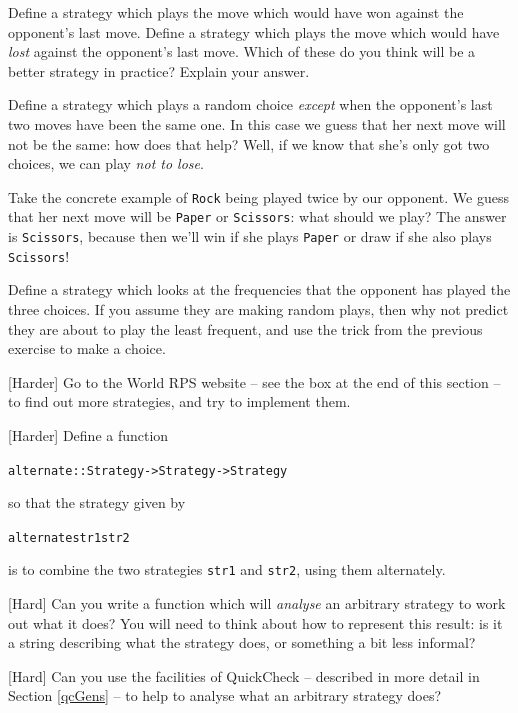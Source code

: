 \begin{exercises}

\item
Define a strategy which plays the move which would have won against the opponent's last move. Define a strategy which plays the move which would have \emph{lost} against the opponent's last move. Which of these do you think will be a better strategy in practice? Explain your answer.

\item
Define a strategy which plays a random choice \emph{except} when the opponent's last two moves have been the same one. In this case we guess that her next move will not be the same: how does that help? Well, if we know that she's only got two choices, we can play \emph{not to lose}. 

Take the concrete example of \texttt{Rock} being played twice by our opponent. We guess that her next move will be \texttt{Paper} or \texttt{Scissors}: what should we play? The answer is \texttt{Scissors}, because then we'll win if she plays \texttt{Paper} or draw if she also plays \texttt{Scissors}!

\item
Define a strategy which looks at the frequencies that the opponent has played the three choices. If you assume they are making random plays, then why not predict they are about to play the least frequent, and use the trick from the previous exercise to make a choice.

\item {[Harder]}
Go to the World RPS website -- see the box at the end of this section -- to find out more strategies, and try to implement them.

\item {[Harder]}
Define a function 
\begin{alltt}
alternate :: Strategy -> Strategy -> Strategy
\end{alltt}
so that the strategy given by
\begin{alltt}
alternate str1 str2
\end{alltt}
is to combine the two strategies \texttt{str1} and \texttt{str2}, using them alternately.

\item {[Hard]}
Can you write a function which will \emph{analyse} an arbitrary strategy to work out what it does? You will need to think about how to represent this result: is it a string describing what the strategy does, or something a bit less informal?

\item {[Hard]}
Can you use the facilities of QuickCheck -- described in more detail in Section \ref{qcGens} -- to help to analyse what an arbitrary strategy does?

\end{exercises}




